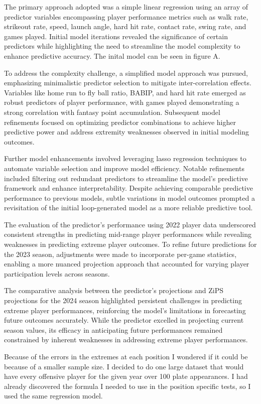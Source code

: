 \documentclass[12pt, english]{article}
\begin{document}
The primary approach adopted was a simple linear regression using an array of predictor variables encompassing player performance metrics such as walk rate, strikeout rate, speed, launch angle, hard hit rate, contact rate, swing rate, and games played. Initial model iterations revealed the significance of certain predictors while highlighting the need to streamline the model complexity to enhance predictive accuracy. The inital model can be seen in figure A.


To address the complexity challenge, a simplified model approach was pursued, emphasizing minimalistic predictor selection to mitigate inter-correlation effects. Variables like home run to fly ball ratio, BABIP, and hard hit rate emerged as robust predictors of player performance, with games played demonstrating a strong correlation with fantasy point accumulation. Subsequent model refinements focused on optimizing predictor combinations to achieve higher predictive power and address extremity weaknesses observed in initial modeling outcomes.


Further model enhancements involved leveraging lasso regression techniques to automate variable selection and improve model efficiency. Notable refinements included filtering out redundant predictors to streamline the model's predictive framework and enhance interpretability. Despite achieving comparable predictive performance to previous models, subtle variations in model outcomes prompted a revisitation of the initial loop-generated model as a more reliable predictive tool.


The evaluation of the predictor's performance using 2022 player data underscored consistent strengths in predicting mid-range player performances while revealing weaknesses in predicting extreme player outcomes. To refine future predictions for the 2023 season, adjustments were made to incorporate per-game statistics, enabling a more nuanced projection approach that accounted for varying player participation levels across seasons.


The comparative analysis between the predictor's projections and ZiPS projections for the 2024 season highlighted persistent challenges in predicting extreme player performances, reinforcing the model's limitations in forecasting future outcomes accurately. While the predictor excelled in projecting current season values, its efficacy in anticipating future performances remained constrained by inherent weaknesses in addressing extreme player performances.

Because of the errors in the extremes at each position I wondered if it could be because of a smaller sample size. I decided to do one large dataset that would have every offensive player for the given year over 100 plate appearances. I had already discovered the formula I needed to use in the position specific tests, so I used the same regression model. 
\end{document}
